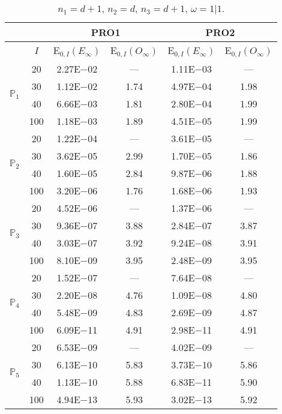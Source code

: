 \begin{table}[H]
\caption{$n_1=d+1$, $n_2=d$, $n_3=d+1$, $\omega=1|1$.}
\setlength{\tabcolsep}{5pt}
\centering
\begin{tabular}{@{}l c c c c c@{}}
\toprule
 &  & \multicolumn{2}{c}{PRO1} & \multicolumn{2}{c}{PRO2}\\
\midrule
 & $I$ & E$_{0,I}(E_{\infty})$ & E$_{0,I}(O_{\infty})$ & E$_{0,I}(E_{\infty})$ & E$_{0,I}(O_{\infty})$\\
\midrule
\multirow{4}{*}{$\mathbb{P}_{1}$}
 & 20 & 2.27E$-$02 & --- & 1.11E$-$03 & ---\\
 & 30 & 1.12E$-$02 & 1.74 & 4.97E$-$04 & 1.98 \\
 & 40 & 6.66E$-$03 & 1.81 & 2.80E$-$04 & 1.99 \\
 & 100 & 1.18E$-$03 & 1.89 & 4.51E$-$05 & 1.99 \\
\midrule
\multirow{4}{*}{$\mathbb{P}_{2}$}
 & 20 & 1.22E$-$04 & --- & 3.61E$-$05 & ---\\
 & 30 & 3.62E$-$05 & 2.99 & 1.70E$-$05 & 1.86 \\
 & 40 & 1.60E$-$05 & 2.84 & 9.87E$-$06 & 1.88 \\
 & 100 & 3.20E$-$06 & 1.76 & 1.68E$-$06 & 1.93 \\
\midrule
\multirow{4}{*}{$\mathbb{P}_{3}$}
 & 20 & 4.52E$-$06 & --- & 1.37E$-$06 & ---\\
 & 30 & 9.36E$-$07 & 3.88 & 2.84E$-$07 & 3.87 \\
 & 40 & 3.03E$-$07 & 3.92 & 9.24E$-$08 & 3.91 \\
 & 100 & 8.10E$-$09 & 3.95 & 2.48E$-$09 & 3.95 \\
\midrule
\multirow{4}{*}{$\mathbb{P}_{4}$}
 & 20 & 1.52E$-$07 & --- & 7.64E$-$08 & ---\\
 & 30 & 2.20E$-$08 & 4.76 & 1.09E$-$08 & 4.80 \\
 & 40 & 5.48E$-$09 & 4.83 & 2.69E$-$09 & 4.87 \\
 & 100 & 6.09E$-$11 & 4.91 & 2.98E$-$11 & 4.91 \\
\midrule
\multirow{4}{*}{$\mathbb{P}_{5}$}
 & 20 & 6.53E$-$09 & --- & 4.02E$-$09 & ---\\
 & 30 & 6.13E$-$10 & 5.83 & 3.73E$-$10 & 5.86 \\
 & 40 & 1.13E$-$10 & 5.88 & 6.83E$-$11 & 5.90 \\
 & 100 & 4.94E$-$13 & 5.93 & 3.02E$-$13 & 5.92 \\
\bottomrule
\end{tabular}
\label{Table:PRO:Rodrigo:Test5}
\end{table}
